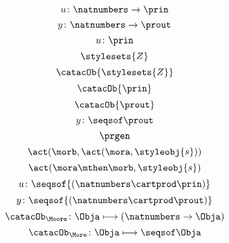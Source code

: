 {\begin{forslides}
        \begin{equation}
            \label{eq:prgen-u-1}
            u\colon \natnumbers \to \prin
        \end{equation}
        \begin{equation}
            \label{eq:prgen-y-1}
            y\colon \natnumbers \to \prout
        \end{equation}
        \begin{equation}
            \label{eq:prgen-u-2}
            u\colon \prin
        \end{equation}
        \begin{equation}
            \label{eq:Z}
            \stylesets{Z}
        \end{equation}
        \begin{equation}
            \label{eq:Za}
            \catacOb{\stylesets{Z}}
        \end{equation}
        \begin{equation}
            \label{eq:Ua}
            \catacOb{\prin}
        \end{equation}
        \begin{equation}
            \label{eq:Ya}
            \catacOb{\prout}
        \end{equation}
        \begin{equation}
            \label{eq:prgen-y-2}
            y\colon \seqsof  \prout
        \end{equation}
        \begin{equation}
            \label{eq:prgen}
            \prgen
        \end{equation}
        \begin{equation}
            \label{eq:now1}
            \act(\morb, \act(\mora, \styleobj{s}))
        \end{equation}
        \begin{equation}
            \label{eq:now2}
            \act(\mora\mthen\morb, \styleobj{s})
        \end{equation}
        \begin{equation}
            \label{eq:ev-sign}
            u\colon \seqsof{(\natnumbers \cartprod \prin)}
        \end{equation}
        \begin{equation}
            \label{eq:ev-sign2}
            y\colon \seqsof{(\natnumbers \cartprod \prout)}
        \end{equation}
        \begin{equation}
            \label{eq:phi-moore}
            {\catacOb_{\Moore}}\colon{\Obja}\longmapsto{(\natnumbers \to \Obja)}
        \end{equation}
        \begin{equation}
            \label{eq:phi-more}
            {\catacOb_{\More}}\colon{\Obja}\longmapsto{\seqsof \Obja}
        \end{equation}
    \end{forslides}
}
